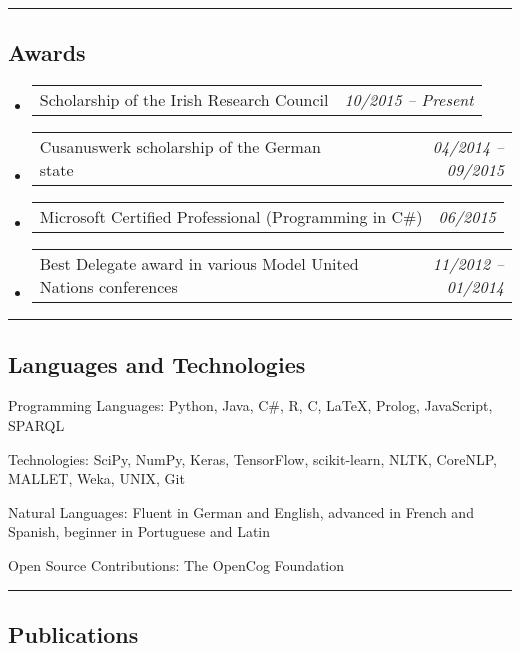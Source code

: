 \documentclass[10pt,letterpaper]{article}
\makeatletter
\newenvironment{indentsection}[1]%
{\begin{list}{}%
	{\setlength{\leftmargin}{#1}}%
	\item[]%
}
{\end{list}}
\newcommand{\headerrow}[2]
{\begin{tabular*}{\linewidth}{l@{\extracolsep{\fill}}r}
	#1 &
	#2 \\
\end{tabular*}}
\makeatother
\begin{document}
\hrule
\vspace{-0.4em}
\subsection*{Awards}

\begin{itemize}
	\parskip=0.1em
	
	\item 
	\headerrow
		{Scholarship of the Irish Research Council}
		{\emph{10/2015 -- Present}}
	\item 
	\headerrow
		{Cusanuswerk scholarship of the German state}
		{\emph{04/2014 -- 09/2015}}	
	\item 
	\headerrow
		{Microsoft Certified Professional (Programming in C\#)}
		{\emph{06/2015}}
	\item 
	\headerrow
		{Best Delegate award in various Model United Nations conferences}
		{\emph{11/2012 -- 01/2014}}

\end{itemize}

\hrule
\vspace{-0.4em}
\subsection*{Languages and Technologies}

\begin{indentsection}{\parindent}
\begin{description*}
	\item[Programming Languages:]
	Python, Java, C\#, R, C, \LaTeX, Prolog, JavaScript, SPARQL
	\item[Technologies:]
	SciPy, NumPy, Keras, TensorFlow, scikit-learn, NLTK, CoreNLP, MALLET, Weka, UNIX, Git
	\item[Natural Languages:]
	Fluent in German and English, advanced in French and Spanish, beginner in Portuguese and Latin	
	\item[Open Source Contributions:]
	The OpenCog Foundation
\end{description*}
\end{indentsection}

\hrule
\vspace{-0.4em}
\subsection*{Publications}
\end{document}
